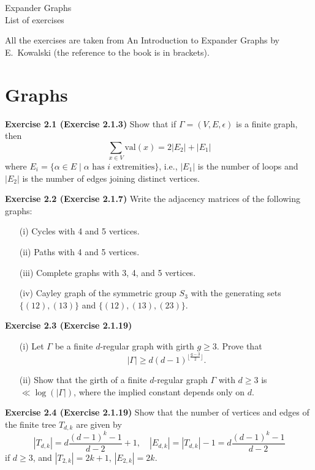 \documentclass[12pt, a4paper]{article}
\begin{document}
\Huge
\begin{center}
    Expander Graphs \\
    \Large
    List of exercises
\end{center}
\normalsize
All the exercises are taken from An Introduction to Expander Graphs by E.~Kowalski %
(the reference to the book is in brackets).

\setcounter{section}{1}
\section{Graphs}

\textbf{Exercise 2.1 (Exercise 2.1.3)}
Show that if $\Gamma = (V, E, \epsilon)$ is a finite graph, then
\[
\sum_{x \in V} \text{val}(x) = 2|E_2| + |E_1|
\]
where $E_i = \{\alpha \in E \mid \alpha \text{ has } i \text{ extremities}\}$, i.e., $|E_1|$ is the number of loops and $|E_2|$ is the number of edges joining distinct vertices.

\textbf{Exercise 2.2 (Exercise 2.1.7)}
Write the adjacency matrices of the following graphs:
\begin{itemize}
    \item[(i)] Cycles with 4 and 5 vertices.
    \item[(ii)] Paths with 4 and 5 vertices.
    \item[(iii)] Complete graphs with 3, 4, and 5 vertices.
    \item[(iv)] Cayley graph of the symmetric group $S_3$ with the generating sets $\{(12), (13)\}$ and $\{(12), (13), (23)\}$.
\end{itemize}

\textbf{Exercise 2.3 (Exercise 2.1.19)}
\begin{itemize}
    \item[(i)] Let $\Gamma$ be a finite $d$-regular graph with girth $g \geq 3$. Prove that
    \[
    |\Gamma| \geq d(d-1)^{\lfloor \frac{g-3}{2} \rfloor}.
    \]
    \item[(ii)] Show that the girth of a finite $d$-regular graph $\Gamma$ with $d \geq 3$ is $\ll \log(|\Gamma|)$, where the implied constant depends only on $d$.
\end{itemize}

\textbf{Exercise 2.4 (Exercise 2.1.19)}
Show that the number of vertices and edges of the finite tree $T_{d,k}$ are given by
\[
|T_{d,k}| = d \frac{(d-1)^k - 1}{d-2} + 1, \quad |E_{d,k}| = |T_{d,k}| - 1 = d \frac{(d-1)^k - 1}{d-2}
\]
if $d \geq 3$, and $|T_{2,k}| = 2k + 1$, $|E_{2,k}| = 2k$.
\end{document}
